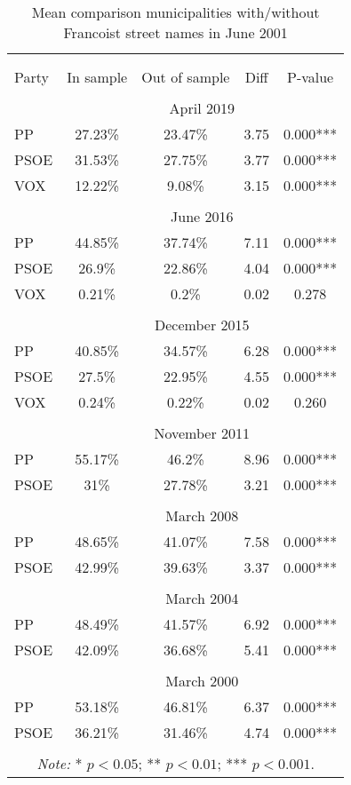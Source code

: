 \begin{table}[!htbp] \centering
\caption{Mean comparison municipalities with/without Francoist street names in June 2001}
\label{tab:ttest_sample2001}
\small
\begin{tabular}{lcccc}
\\[-1.8ex]\hline
\hline \\[-1.8ex]
\\[-1.8ex]
Party & In sample & Out of sample & Diff & P-value \\
\hline \\[-1.8ex]
& \multicolumn{4}{c}{April 2019}\\
PP & 27.23\% & 23.47\% & 3.75 & 0.000*** \\
PSOE & 31.53\% & 27.75\% & 3.77 & 0.000*** \\
VOX & 12.22\% & 9.08\% & 3.15 & 0.000*** \\
\hline \\[-1.8ex]
& \multicolumn{4}{c}{June 2016}\\
PP & 44.85\% & 37.74\% & 7.11 & 0.000*** \\
PSOE & 26.9\% & 22.86\% & 4.04 & 0.000*** \\
VOX & 0.21\% & 0.2\% & 0.02 & 0.278 \\
\hline \\[-1.8ex]
& \multicolumn{4}{c}{December 2015}\\
PP & 40.85\% & 34.57\% & 6.28 & 0.000*** \\
PSOE & 27.5\% & 22.95\% & 4.55 & 0.000*** \\
VOX & 0.24\% & 0.22\% & 0.02 & 0.260 \\
\hline \\[-1.8ex]
& \multicolumn{4}{c}{November 2011}\\
PP & 55.17\% & 46.2\% & 8.96 & 0.000*** \\
PSOE & 31\% & 27.78\% & 3.21 & 0.000*** \\
\hline \\[-1.8ex]
& \multicolumn{4}{c}{March 2008}\\
PP & 48.65\% & 41.07\% & 7.58 & 0.000*** \\
PSOE & 42.99\% & 39.63\% & 3.37 & 0.000*** \\
\hline \\[-1.8ex]
& \multicolumn{4}{c}{March 2004}\\
PP & 48.49\% & 41.57\% & 6.92 & 0.000*** \\
PSOE & 42.09\% & 36.68\% & 5.41 & 0.000*** \\
\hline \\[-1.8ex]
& \multicolumn{4}{c}{March 2000}\\
PP & 53.18\% & 46.81\% & 6.37 & 0.000*** \\
PSOE & 36.21\% & 31.46\% & 4.74 & 0.000*** \\
\hline
\hline \\[-1.8ex]
\multicolumn{5}{c}{\parbox[t]{0.65\textwidth}{\textit{Note:} * $p<0.05$; ** $p<0.01$; *** $p<0.001$.}}\\
\end{tabular}
\end{table}
